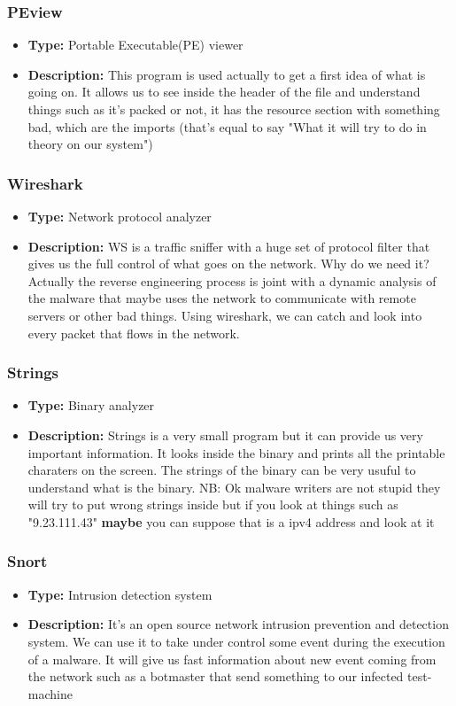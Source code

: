 \documentclass[]{beamer}
\begin{document}
		\begin{frame}
			\frametitle{PEview}
				\begin{itemize}
					\item{\textbf{Type:} Portable Executable(PE) viewer}
					\item{\textbf{Description:} This program is used actually to get a first idea of what is going on. It allows us to see inside the header of the file and understand things such as it's packed or not, it has the resource section with something bad, which are the imports (that's equal to say "What it will try to do in theory on our system")}
				\end{itemize}
		\end{frame}
		\begin{frame}
			\frametitle{Wireshark}
				\begin{itemize}
					\item{\textbf{Type:} Network protocol analyzer}
					\item{\textbf{Description:} WS is a traffic sniffer with a huge set of protocol filter that gives us the full control of what goes on the network. Why do we need it? Actually the reverse engineering process is joint with a dynamic analysis of the malware that maybe uses the network to communicate with remote servers or other bad things. Using wireshark, we can catch and look into every packet that flows in the network. }
				\end{itemize}
		\end{frame}
		\begin{frame}
			\frametitle{Strings}
				\begin{itemize}
					\item{\textbf{Type:} Binary analyzer }
					\item{\textbf{Description:} Strings is a very small program but it can provide us very important information. It looks inside the binary and prints all the printable charaters on the screen. The strings of the binary can be very usuful to understand what is the binary. NB: Ok malware writers are not stupid they will try to put wrong strings inside but if you look at things such as "9.23.111.43" \textbf{maybe} you can suppose that is a ipv4 address and look at it } 
				\end{itemize}			
		\end{frame}
		\begin{frame}
			\frametitle{Snort}
				\begin{itemize}		
					\item{\textbf{Type:} Intrusion detection system}
					\item{\textbf{Description:} It's an open source network intrusion prevention and detection system. We can use it to take under control some event during the execution of a malware. It will give us fast information about new event coming from the network such as a botmaster that send something to our infected test-machine }
				\end{itemize}
		\end{frame}
\end{document}

